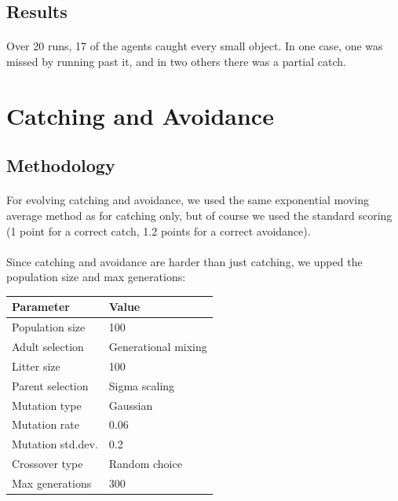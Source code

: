 \documentclass[a4paper,12pt]{article}
\begin{document}
\subsection{Results}
\paragraph{}Over 20 runs, 17 of the agents caught every small object. In one case, one was missed by running past it, and in two others there was a partial catch.

\section{Catching and Avoidance}
\subsection{Methodology}
\paragraph{}For evolving catching and avoidance, we used the same exponential moving average method as for catching only, but of course we used the standard scoring (1 point for a correct catch, 1.2 points for a correct avoidance).
\paragraph{}Since catching and avoidance are harder than just catching, we upped the population size and max generations:\\
\begin{tabular}{ll}
\hline
Parameter & Value \\
\hline \hline
Population size & 100 \\
Adult selection & Generational mixing \\
Litter size & 100 \\
Parent selection & Sigma scaling \\
Mutation type & Gaussian \\
Mutation rate & 0.06 \\
Mutation std.dev. & 0.2 \\
Crossover type & Random choice \\
Max generations & 300 \\
\hline
\end{tabular}
\end{document}
